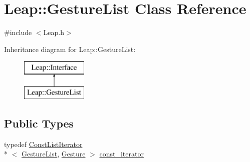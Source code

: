 \hypertarget{class_leap_1_1_gesture_list}{\section{Leap\+:\+:Gesture\+List Class Reference}
\label{class_leap_1_1_gesture_list}
}


{\ttfamily \#include $<$Leap.\+h$>$}

Inheritance diagram for Leap\+:\+:Gesture\+List\+:\begin{figure}[H]
\begin{center}
\leavevmode
\includegraphics[height=2.000000cm]{class_leap_1_1_gesture_list}
\end{center}
\end{figure}
\subsection*{Public Types}
\begin{DoxyCompactItemize}
\item 
typedef \hyperlink{class_leap_1_1_const_list_iterator}{Const\+List\+Iterator}\\*
$<$ \hyperlink{class_leap_1_1_gesture_list}{Gesture\+List}, \hyperlink{class_leap_1_1_gesture}{Gesture} $>$ \hyperlink{class_leap_1_1_gesture_list_aaf2fd030e686892a0da42d81fc0cad88}{const\+\_\+iterator}
\end{DoxyCompactItemize}

